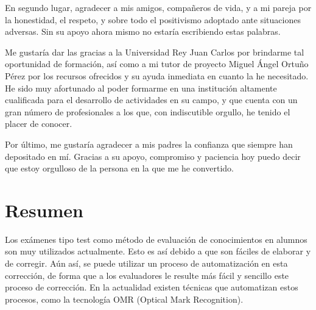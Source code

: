 \documentclass[a4paper, 12pt]{book}
\begin{document}
En segundo lugar, agradecer a mis amigos, compañeros de vida, 
y a mi pareja por la honestidad,
el respeto, y sobre todo el positivismo adoptado ante situaciones adversas.
Sin su apoyo ahora mismo no estaría escribiendo estas palabras.

Me gustaría dar las gracias a la Universidad Rey Juan Carlos por brindarme
tal oportunidad de formación, así como a mi tutor de proyecto Miguel
Ángel Ortuño Pérez por los recursos
ofrecidos y su ayuda inmediata en cuanto la he necesitado. He sido muy
afortunado al poder formarme en una institución altamente cualificada para
el desarrollo de actividades en su campo, y que cuenta con un gran número
de profesionales a los que, con indiscutible orgullo, he tenido el placer
de conocer.

Por último, me gustaría agradecer a mis padres la confianza que siempre
han depositado en mí. Gracias a su apoyo, compromiso y paciencia hoy puedo
decir que estoy orgulloso de la persona en la que me he convertido.


\chapter*{Resumen}

Los exámenes tipo test como método de evaluación de conocimientos en
alumnos son muy utilizados actualmente. Esto es así debido a que son
fáciles de elaborar y de corregir. Aún así, se puede utilizar un
proceso de automatización en esta corrección, de forma que a los
evaluadores le resulte más fácil y sencillo este proceso de corrección.
En la actualidad existen técnicas que automatizan estos procesos, como
la tecnología OMR (Optical Mark Recognition).
\end{document}

